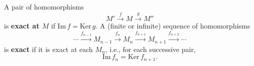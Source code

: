 A pair of homomorphisms
$$M' \xrightarrow{f} M \xrightarrow{g} M''$$
is \textbf{exact at $M$} if $\text{Im}\, f = \text{Ker}\, g$. A (finite or infinite) sequence of homomorphisms
$$\cdots \xrightarrow{f_{n-1}} M_{n-1} \xrightarrow{f_n} M_n \xrightarrow{f_{n+1}} M_{n+1} \xrightarrow{f_{n+2}} \cdots$$
is \textbf{exact} if it is exact at each $M_n$, i.e., for each successive pair,
$$\text{Im}\, f_n = \text{Ker}\, f_{n+1}.$$
